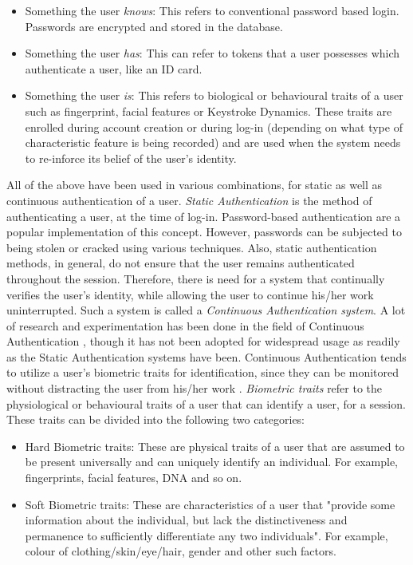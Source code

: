 \documentclass[%
        final,
        notitlepage,
        narroweqnarray,
        inline,
        ]{ieee}
\begin{document}
\begin{itemize}
	\item Something the user \emph{knows}: This refers to conventional password based login. Passwords are encrypted and stored in the database.
	\item Something the user \emph{has}: This can refer to tokens that a user possesses which authenticate a user, like an ID card. 
	\item Something the user \emph{is}: This refers to biological or behavioural traits of a user such as fingerprint, facial features or Keystroke Dynamics\cite{mon00}. These traits are enrolled during account creation or during log-in (depending on what type of characteristic feature is being recorded) and are used when the system needs to re-inforce its belief of the user's identity.
\end{itemize}
All of the above have been used in various combinations, for static as well as continuous authentication of a user. \emph{Static Authentication} is the method of authenticating a user, at the time of log-in. Password-based authentication are a popular implementation of this concept. However, passwords can be subjected to being stolen or cracked using various techniques. Also, static authentication methods, in general, do not ensure that the user remains authenticated throughout the session. Therefore, there is need for a system that continually verifies the user's identity, while allowing the user to continue his/her work uninterrupted. Such a system is called a \emph{Continuous Authentication system}.
A lot of research and experimentation has been done in the field of Continuous Authentication \cite{Niin10,Klos00,mon00,turk03,sim07,azz08,azz082}, though it has not been adopted for widespread usage as readily as the Static Authentication systems have been. Continuous Authentication tends to utilize a user's biometric traits for identification, since they can be monitored without distracting the user from his/her work \cite{Klos00}. \emph{Biometric traits} refer to the physiological or behavioural traits of a user that can identify a user, for a session. These traits can be divided into the following two categories:
\begin{itemize}
	\item Hard Biometric traits: These are physical traits of a user that are assumed to be present universally and can uniquely identify an individual. For example, fingerprints, facial features, DNA and so on.
	\item Soft Biometric traits: These are characteristics of a user that "provide some information about the individual, but lack the distinctiveness and permanence to sufficiently differentiate any two individuals"\cite{Jain204}. For example, colour of clothing/skin/eye/hair, gender and other such factors.
\end{itemize}
\end{document}
